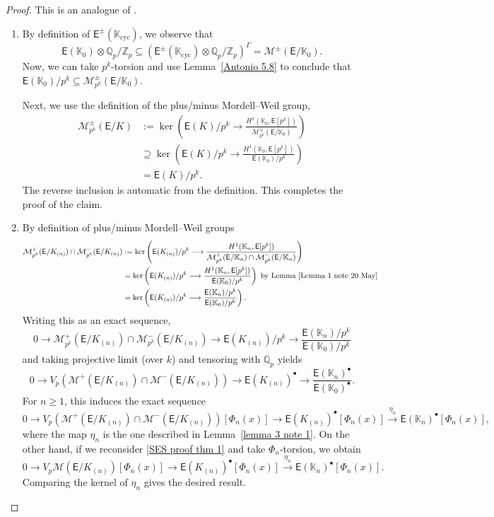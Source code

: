 \documentclass{amsart}
\numberwithin{equation}{section}
\theoremstyle{remark}
\newcommand{\EC}{\mathsf{E}}
\newcommand{\cM}{\mathcal{M}}
\newcommand{\Qp}{\mathbb{Q}_p}
\newcommand{\Kn}{\mathbb{K}_{n}}
\newcommand{\K}{\mathbb{K}}
\newcommand{\Zp}{\mathbb{Z}_p}
\newcommand{\cyc}{\operatorname{{cyc}}}
\theoremstyle{plain} %
\begin{document}
\begin{proof}
This is an analogue of \cite[Lemma~6.3]{Lei23}.
\begin{enumerate}
\item[\textup{(}i\textup{)}]
By definition of $\EC^{\pm}(\K_{\cyc})$, we observe that
\[
\EC(\K_0) \otimes \Qp/\Zp \subseteq (\EC^{\pm}(\K_{\cyc}) \otimes \Qp/\Zp)^{\Gamma} = \cM^{\pm}(\EC/\K_0).
\]
Now, we can take $p^k$-torsion and use Lemma~\ref{Antonio 5.8} to conclude that $\EC(\K_0)/p^k \subseteq \cM^{\pm}_{p^k}(\EC/\K_0)$.

Next, we use the definition of the plus/minus Mordell--Weil group,
\begin{align*}
\cM^{\pm}_{p^k}(\EC/K) &:= \ker\left( \EC(K)/p^k \longrightarrow \frac{H^1(\K_0, \EC[p^k])}{\cM_{p^k}^{\pm}(\EC/\K_0)} \right) \\
& \supseteq \ker\left( \EC(K)/p^k \longrightarrow \frac{H^1(\K_0, \EC[p^k])}{\EC(\K_0)/p^k} \right) \\
&= \EC(K)/p^k.
\end{align*}
The reverse inclusion is automatic from the definition.
This completes the proof of the claim.

\item[\textup{(}ii\textup{)}] 
By definition of plus/minus Mordell--Weil groups
\begin{align*}
\cM^{+}_{p^k}(\EC/K_{(n)}) \cap \cM^{-}_{p^k}(\EC/K_{(n)})&:= \ker\left( \EC(K_{(n)})/p^k \longrightarrow \frac{H^1(\Kn, \EC[p^k])}{\cM_{p^k}^{+}(\EC/\Kn) \cap \cM_{p^k}^{-}(\EC/\Kn)} \right) \\
& = \ker\left( \EC(K_{(n)})/p^k \longrightarrow \frac{H^1(\Kn, \EC[p^k])}{\EC(\K_0)/p^k} \right) \text{ by Lemma}~\ref{Lemma 1 note 20 May} \\
&= \ker\left( \EC(K_{(n)})/p^k \longrightarrow \frac{\EC(\Kn)/p^k}{\EC(\K_0)/p^k} \right).
\end{align*}
Writing this as an exact sequence,
\[
0 \longrightarrow \cM^{+}_{p^k}(\EC/K_{(n)}) \cap \cM^{-}_{p^k}(\EC/K_{(n)}) \longrightarrow \EC(K_{(n)})/p^k \longrightarrow \frac{\EC(\Kn)/p^k}{\EC(\K_0)/p^k}
\]
and taking projective limit (over $k$) and tensoring with $\Qp$ yields
\[
0 \longrightarrow  V_p(\cM^{+}(\EC/K_{(n)}) \cap \cM^{-}(\EC/K_{(n)})) \longrightarrow \EC(K_{(n)})^{\bullet} \longrightarrow \frac{\EC(\Kn)^{\bullet}}{\EC(\K_0)^{\bullet}}.
\]
For $n\geq 1$, this induces the exact sequence
\[
0 \longrightarrow  V_p(\cM^{+}(\EC/K_{(n)}) \cap \cM^{-}(\EC/K_{(n)}))[\Phi_n(x)] \longrightarrow \EC(K_{(n)})^{\bullet}[\Phi_n(x)] \xrightarrow{\eta_n} \EC(\Kn)^{\bullet}[\Phi_n(x)],
\]
where the map $\eta_n$ is the one described in Lemma~\ref{lemma 3 note 1}.
On the other hand, if we reconsider \eqref{SES proof thm 1} and take $\Phi_n$-torsion, we obtain
\[
0 \longrightarrow V_p\cM(\EC/K_{(n)})[\Phi_n(x)] \longrightarrow \EC(K_{(n)})^{\bullet}[\Phi_n(x)] \xrightarrow{\eta_n} \EC(\Kn)^{\bullet}[\Phi_n(x)].
\]
Comparing the kernel of $\eta_n$ gives the desired result. \qedhere
\end{enumerate}
\end{proof}
\end{document}
